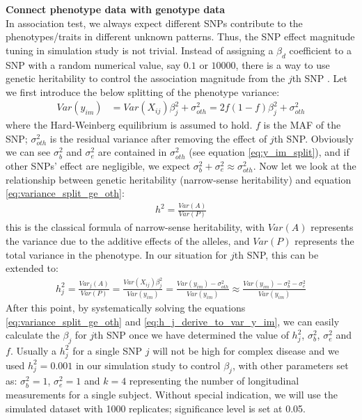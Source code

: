 \documentclass[12pt]{article}
\begin{document}
\textbf{Connect phenotype data with genotype data}\\
In association test, we always expect different SNPs contribute to the phenotypes/traits in different unknown patterns. Thus, the SNP effect magnitude tuning in simulation study is not trivial. Instead of assigning a $\beta_d$ coefficient to a SNP with a random numerical value, say $0.1$ or $10000$, there is a way to use genetic heritability to control the association magnitude from the $j$th SNP \cite{Lynch1998}. Let we first introduce the below splitting of the phenotype variance:
\begin{align}
Var(y_{im} ) & = Var(X_{ij}) \beta_j^2 + \sigma_{oth} ^ 2  = 2f(1-f) \beta_j^2 + \sigma_{oth}^2
\label{eq:variance_split_ge_oth}
\end{align}
where the Hard-Weinberg equilibrium is assumed to hold. $f$ is the MAF of the SNP; $\sigma_{oth}^2$ is the residual variance after removing the effect of $j$th SNP. Obviously we can see $\sigma_b^2$ and $\sigma_e^2$ are contained in $\sigma_{oth}^2$ (see equation \eqref{eq:y_im_split}), and if other SNPs' effect are negligible, we expect $\sigma_b^2 + \sigma_e^2 \approx \sigma_{oth}^2$. Now let we look at the relationship between genetic heritability (narrow-sense heritability) and equation \eqref{eq:variance_split_ge_oth}:
\begin{align}
h^2 = \frac{Var(A)}{Var(P)}
\end{align}
this is the classical formula of narrow-sense heritability, with $Var(A)$ represents the variance due to the additive effects of the alleles, and $Var(P)$ represents the total variance in the phenotype. In our situation for $j$th SNP, this can be extended to:
\begin{align}
h_j^2 = \frac{Var_j(A)}{Var(P)} = \frac{Var(X_{ij}) \beta_j^2 } {Var(y_{im} )} = \frac{Var(y_{im} ) - \sigma^2_{oth} } {Var(y_{im} )} \approx \frac{Var(y_{im} ) - \sigma_b^2 - \sigma_e^2 } {Var(y_{im} )}
\label{eq:h_j_derive_to_var_y_im}
\end{align}
After this point, by systematically solving the equations \eqref{eq:variance_split_ge_oth} and \eqref{eq:h_j_derive_to_var_y_im}, we can easily calculate the $\beta_j$ for $j$th SNP once we have determined the value of $h_j^2$, $\sigma_b^2$, $\sigma_e^2$ and $f$. Usually a $h_j^2$ for a single SNP $j$ will not be high for complex disease and we used $h_j^2 = 0.001$ in our simulation study to control $\beta_j$, with other parameters set as: $\sigma_b^2 = 1$, $\sigma_e^2 = 1$ and $k = 4$ representing the number of longitudinal measurements for a single subject. Without special indication, we will use the simulated dataset with 1000 replicates; significance level is set at 0.05. \\ 
\end{document}
